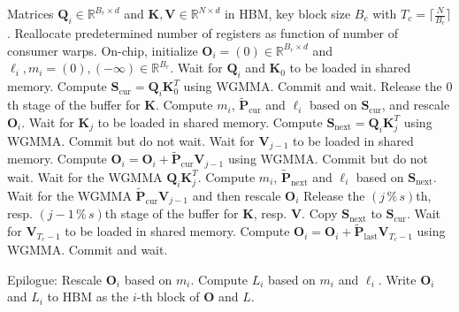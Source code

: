 \begin{algorithm}[H]
    \caption{\small\label{alg:flash3_wgmma}\textsc{FlashAttention-3} consumer warpgroup forward pass}
    \begin{algorithmic}[1]
      \REQUIRE  Matrices $\mathbf{Q}_i \in \mathbb{R}^{B_r \times d}$ and $\mathbf{K}, \mathbf{V} \in \mathbb{R}^{N \times d}$ in HBM, key block size $B_c$ with $T_c = \lceil \frac{N}{B_c} \rceil$.
      \STATE Reallocate predetermined number of registers as function of number of consumer warps.
      \STATE On-chip, initialize $\mathbf{O}_i = (0) \in \mathbb{R}^{B_r \times d}$ and $\ell_i, m_i = (0), (-\infty) \in \mathbb{R}^{B_r}$.
      \STATE Wait for $\mathbf{Q}_i$ and $\mathbf{K}_0$ to be loaded in shared memory.
      \STATE Compute $\mathbf{S}_{\mathrm{cur}} = \mathbf{Q}_i \mathbf{K}_0^T$ using WGMMA. Commit and wait.
      \STATE Release the $0$th stage of the buffer for $\mathbf{K}$.
      \STATE Compute $m_{i}$, $\tilde{\mathbf{P}}_{\mathrm{cur}}$ and $\ell_{i}$ based on $\mathbf{S}_{\mathrm{cur}}$, and rescale $\mathbf{O}_i$.
        \STATE Wait for $\mathbf{K}_j$ to be loaded in shared memory.
        \label{code:mainloop_start}
        \STATE Compute $\mathbf{S}_{\mathrm{next}} = \mathbf{Q}_i \mathbf{K}_{j}^T$ using WGMMA. Commit but do not wait. \label{code:first_wgmma}
        \STATE Wait for $\mathbf{V}_{j-1}$ to be loaded in shared memory.
        \STATE Compute $\mathbf{O}_{i} = \mathbf{O}_{i} + \tilde{\mathbf{P}}_{\mathrm{cur}} \mathbf{V}_{j-1}$ using WGMMA. Commit but do not wait. \label{code:second_wgmma}
        \STATE Wait for the WGMMA $\mathbf{Q}_i \mathbf{K}_{j}^T$.
        \STATE Compute $m_{i}$, $\tilde{\mathbf{P}}_{\mathrm{next}}$ and $\ell_{i}$ based on $\mathbf{S}_{\mathrm{next}}$. \label{code:softmax}
        \STATE Wait for the WGMMA $\tilde{\mathbf{P}}_{\mathrm{cur}} \mathbf{V}_{j-1}$ and then rescale $\mathbf{O}_i$
        \STATE Release the $(j\,\%\,s)$th, resp. $(j-1\,\%\,s)$th stage of the buffer for $\mathbf{K}$, resp. $\mathbf{V}$.
        \STATE Copy $\mathbf{S}_{\mathrm{next}}$ to $\mathbf{S}_{\mathrm{cur}}$.
        \label{code:mainloop_end}
      \ENDFOR \STATE Wait for $\mathbf{V}_{T_c - 1}$ to be loaded in shared memory.
      \STATE Compute
      $\mathbf{O}_{i} = \mathbf{O}_{i} + \tilde{\mathbf{P}}_{\mathrm{last}} \mathbf{V}_{T_c - 1}$ using WGMMA. Commit and wait.

      \STATE Epilogue: Rescale $\mathbf{O}_{i}$ based on $m_{i}$. Compute $L_{i}$ based on $m_{i}$ and $\ell_{i}$.
      Write $\mathbf{O}_{i}$ and $L_{i}$ to HBM as the $i$-th block of $\mathbf{O}$ and $L$.
    \end{algorithmic}
  \end{algorithm}

